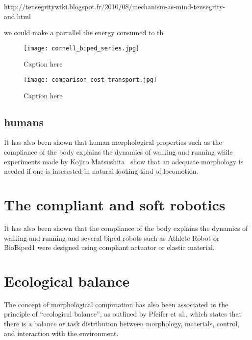 http://tensegritywiki.blogspot.fr/2010/08/mechanism-as-mind-tensegrity-and.html

we could make a parrallel the energy consumed to th
\begin{figure}[]
    \begin{center}
        \texttt{[image: cornell\_biped\_series.jpg]}
    \end{center}
    \caption{Caption here}
    \label{fig:figure1}
\end{figure}

\begin{figure}[]
    \begin{center}
        \texttt{[image: comparison\_cost\_transport.jpg]}
    \end{center}
    \caption{Caption here}
    \label{fig:figure1}
\end{figure}

\subsection{humans} %
\label{sub:humans}

It has also been shown that human morphological properties such as the compliance of the body explains the dynamics of walking and running \cite{Geyer2006} while experiments made by Kojiro Matsushita~\cite{matsushita2005locomoting} show that an adequate morphology is needed if one is interested in natural looking kind of locomotion.


\section{The compliant and soft robotics} %
It has also been shown that the compliance of the body explains the dynamics of walking and running \cite{Geyer2006} and several biped robots such as Athlete Robot \cite{niiyama2010athlete} or BioBiped1 \cite{radkhah2011concept} were designed using compliant actuator or elastic material.

\section{Ecological balance}

The concept of morphological computation has also been associated to the principle of “ecological balance”, as outlined by Pfeifer et al.\cite{pfeifer2005new}, which states that there is a balance or task distribution between morphology, materials, control, and interaction with the environment.

